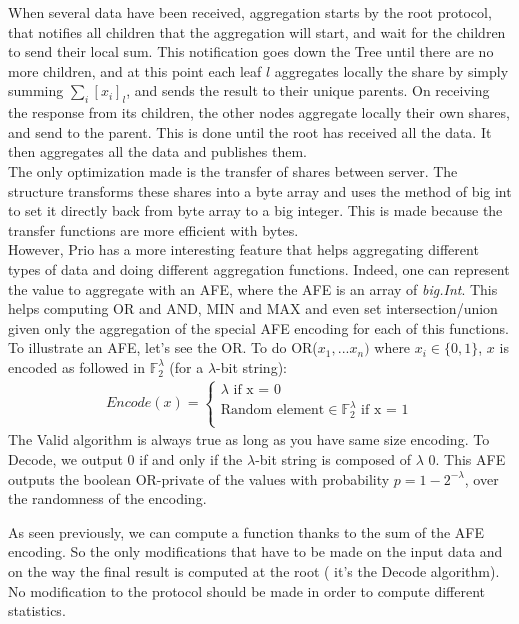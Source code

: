 \documentclass{article}
\begin{document}
When several data have been received, aggregation starts by the root protocol, that notifies all children that the aggregation will start, and wait for the children to send their local sum. This notification goes down the Tree until there are no more children, and at this point each leaf $l$ aggregates locally the share by simply summing $\sum_{i}[x_i]_l$, and sends the result to their unique parents. On receiving the response from its children, the other nodes aggregate locally their own shares, and send to the parent. This is done until the root has received all the data. It then aggregates all the data and publishes them.\\
The only optimization made is the transfer of shares between server. The structure transforms these shares into a byte array and uses the method of big int to set it directly back from byte array to a big integer. This is made because the transfer functions are more efficient with bytes.\\

However, Prio has a more interesting feature that helps aggregating different types of data and doing different aggregation functions. Indeed, one can represent the value to aggregate with an AFE, where the AFE is an array of \textit{big.Int}. This helps computing OR and AND, MIN and MAX and even set intersection/union given only the aggregation of the special AFE encoding for each of this functions.\\
To illustrate an AFE, let's see the OR. To do OR($x_1,...x_n)$ where $x_i \in \{0,1\} $, $x$ is encoded as followed in $\mathbb{F}_2^{\lambda}$ (for a $\lambda$-bit string):
\begin{align*}
    Encode(x)=\left\{
                \begin{array}{ll}
                  \lambda		\text{                                          if x = 0}\\
                  \text{Random element} \in \mathbb{F}^{\lambda}_{2}		\text{											if x = 1}\\
                \end{array}
              \right.
\end{align*}
The Valid algorithm is always true as long as you have same size encoding. To Decode, we output 0 if and only if the $\lambda$-bit string is composed of $\lambda$ 0. This AFE outputs the boolean OR-private of the values with probability $p = 1- 2^{-\lambda}$, over the randomness of the encoding.

As seen previously, we can compute a function thanks to the sum of the AFE encoding. So the only modifications that have to be made on the input data and on the way the final result is computed at the root ( it's the Decode algorithm). No modification to the protocol should be made in order to compute different statistics.
\end{document}
